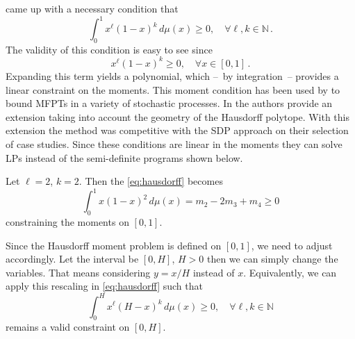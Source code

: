 \citet{hausdorff} came up with a necessary condition that
\begin{equation}\label{eq:hausdorff}
    \int_0^1 x^\ell(1-x)^k\,d\mu(x) \geq 0, \quad \forall \ell, k\in\mathbb{N}\,.
\end{equation}
The validity of this condition is easy to see since
\begin{equation}\label{eq:hausdorff_integrand}
	x^\ell(1-x)^k\geq 0, \quad \forall x\in[0,1]\,.
\end{equation}
Expanding this term yields a polynomial, which --~by integration~-- provides a linear constraint on the moments.
This moment condition has been used by \citet{helmes2001computing} to bound \acp{MFPT} in a variety of stochastic processes.
In \citet{helmes2008geometrical} the authors provide an extension taking into account the geometry of the Hausdorff polytope.
With this extension the method was competitive with the \ac{SDP} approach on their selection of case studies.
Since these conditions are linear in the moments they can solve \acp{LP} instead of the semi-definite programs shown below.

\begin{example}
	Let $\ell = 2$, $k=2$. Then the \eqref{eq:hausdorff} becomes
	\[
		\int_0^1 x (1 - x)^2 \,d\mu(x) =
		m_2 - 2 m_3 + m_4 \geq 0
	\]
	constraining the moments on $[0,1]$.
\end{example}

Since the Hausdorff moment problem is defined on $[0,1]$, we need to adjust accordingly.
Let the interval be $[0,H]$, $H>0$ then we can simply change the variables.
That means considering $y=x/H$ instead of $x$.
Equivalently, we can apply this rescaling in \eqref{eq:hausdorff} such that
\begin{equation}\label{eq:hausdorff_scaled}
	\int_0^H x^\ell(H-x)^k\,d\mu(x) \geq 0, \quad \forall \ell, k\in\mathbb{N}
\end{equation}
remains a valid constraint on $[0,H]$.

